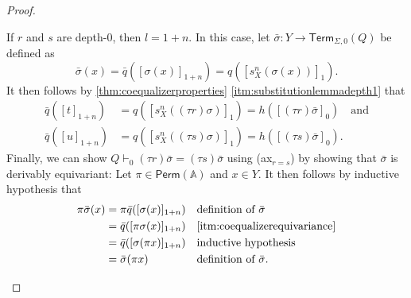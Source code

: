 \documentclass[11pt,a4paper]{amsart}
\newcommand{\Perm}{\mathsf{Perm}(\Names)}
\newcommand{\Term}{\mathsf{Term}}
\newcommand{\sig}{\Sigma}
\newcommand{\Names}{\mathbb{A}}
\theoremstyle{plain}
\numberwithin{equation}{section}
\newcommand{\+}[1]{\mathcal{#1}\xspace}
\theoremstyle{definition}
\begin{document}
\begin{proof}
\begin{enumerate}[wide]
\begin{itemize}
                    If \(r\) and \(s\) are depth-0, then \(l = 1 + n\).
                    In this case, let \(\bar{\sigma}: Y \to \Term_{\sig, 0}(Q)\) be defined as
                    \[
                        \bar{\sigma}(x) = \bar{q}([\sigma(x)]_{1 + n}) = q([s^n_X(\sigma(x))]_1).
                    \]
                    It then follows by \cref{thm:coequalizerproperties} \eqref{itm:substitutionlemmadepth1} that
                    \begin{align*}
                        \bar{q}([t]_{1 + n}) &= q([s^n_X((\tau r)\sigma)]_1) = h([(\tau r)\bar{\sigma}]_0) \quad \text{and} \\
                        \bar{q}([u]_{1 + n}) &= q([s^n_X((\tau s)\sigma)]_1) = h([(\tau s)\bar{\sigma}]_0).
                    \end{align*}
                    Finally, we can show \(Q \vdash_0 (\tau r)\bar{\sigma} = (\tau s)\bar{\sigma}\) using (ax$_{r = s}$) by showing that \(\bar{\sigma}\) is derivably equivariant:
                    Let \(\pi \in \Perm\) and \(x \in Y\).
                    It then follows by inductive hypothesis that
                    \begin{align*}
                        \pi\bar{\sigma}(x)
                        &= \pi\bar{q}([\sigma(x)]_{1 + n}) && \text{definition of } \bar{\sigma} \\
                        &= \bar{q}([\pi \sigma(x)]_{1 + n}) && \text{\eqref{itm:coequalizerequivariance}} \\
                        &= \bar{q}([\sigma(\pi x)]_{1 + n}) && \text{inductive hypothesis} \\
                        &= \bar{\sigma}(\pi x) && \text{definition of } \bar{\sigma}.
                    \end{align*}


\end{itemize}
\end{enumerate}
\end{proof}
\end{document}
